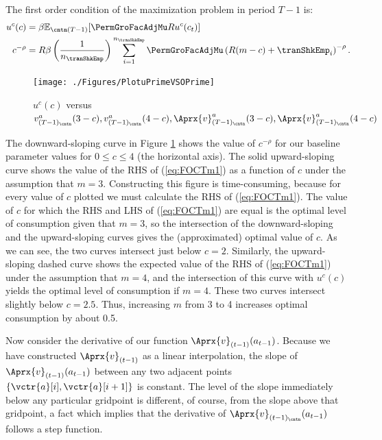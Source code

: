 \documentclass[titlepage, headings=optiontotocandhead]{econtex}
\begin{document}
The first order condition of the maximization problem in period $T-1$ is:
  \begin{equation}\begin{gathered}\begin{aligned}
        u^{c}(c)       & = \beta {\mathbb{E}}_{\cntn(T-1)} [\PermGroFacAdjMu R u^{c}(c_{t})]  %
        \\      c^{-\rho}   & = R \beta \left(\frac{1}{n_{\tranShkEmp}}\right) \sum_{i=1}^{n_{\tranShkEmp}} \PermGroFacAdjMu\left(R (m-c) + \tranShkEmp_{i}\right)^{-\rho} \label{eq:FOCTm1}.
      \end{aligned}\end{gathered}\end{equation}
\hypertarget{PlotuPrimeVSOPrime}{}
\begin{figure}
  \centerline{\texttt{[image: ./Figures/PlotuPrimeVSOPrime]}}
  \caption{$u^{c}(c)$ versus $v_{({T-1})_\cntn}^{a}(3-c), v_{({T-1})_\cntn}^{a}(4-c), \Aprx{v}_{({T-1})_\cntn}^{a}(3-c), \Aprx{v}_{({T-1})_\cntn}^{a}(4-c)$}
  \label{fig:PlotuPrimeVSOPrime}
\end{figure}



The downward-sloping curve in Figure \ref{fig:PlotuPrimeVSOPrime}
shows the value of $c^{-\rho}$ for our baseline parameter values
for $0 \leq c \leq 4$ (the horizontal axis).  The solid
upward-sloping curve shows the value of the RHS of (\ref{eq:FOCTm1})
as a function of $c$ under the assumption that $m=3$.
Constructing this figure is time-consuming, because for every
value of $c$ plotted we must calculate the RHS of
(\ref{eq:FOCTm1}).  The value of $c$ for which the RHS and LHS
of (\ref{eq:FOCTm1}) are equal is the optimal level of consumption
given that $m=3$, so the intersection of the downward-sloping
and the upward-sloping curves gives the (approximated) optimal value of $c$.
As we can see, the two curves intersect just below $c=2$.
Similarly, the upward-sloping dashed curve shows the expected value
of the RHS of (\ref{eq:FOCTm1}) under the assumption that $m=4$,
and the intersection of this curve with $u^{c}(c)$ yields the
optimal level of consumption if $m=4$.  These two curves
intersect slightly below $c=2.5$.  Thus, increasing $m$
from 3 to 4 increases optimal consumption by about 0.5.

Now consider the derivative of our function $\Aprx{v}_{(t-1)}(a_{t-1})$.  Because we have
constructed $\Aprx{v}_{(t-1)}$ as a linear interpolation, the slope of
$\Aprx{v}_{(t-1)}(a_{t-1})$ between any two adjacent points
$\{\vctr{a}[i],\vctr{a}[{i+1}]\}$ is constant.  The level of the slope immediately below any
particular gridpoint is different, of course, from the slope above that gridpoint, a fact which
implies that the derivative of $\Aprx{v}_{(t-1)_\cntn}(a_{t-1})$ follows a step function.
\end{document}
